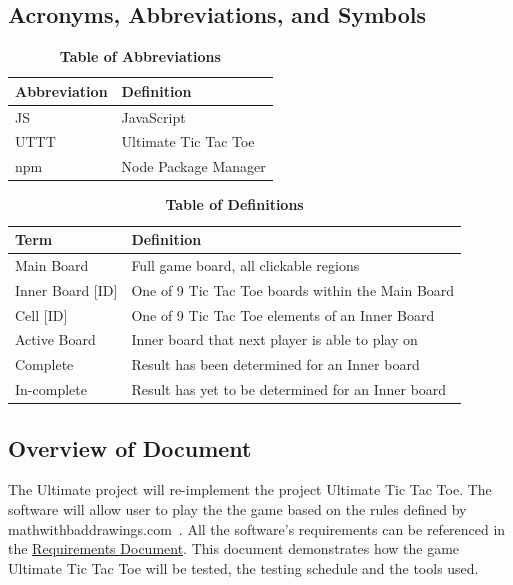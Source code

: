 \documentclass[12pt, titlepage]{article}
\begin{document}
\subsection{Acronyms, Abbreviations, and Symbols}
	
\begin{table}[hbp]
\caption{\textbf{Table of Abbreviations}} \label{Table}

\begin{tabularx}{\textwidth}{p{3cm}X}
\toprule
\textbf{Abbreviation} & \textbf{Definition} \\
\midrule
JS & JavaScript\\
UTTT & Ultimate Tic Tac Toe\\
npm & Node Package Manager\\
\bottomrule
\end{tabularx}

\end{table}

\begin{table}[!htbp]
\caption{\textbf{Table of Definitions}} \label{Table}

\begin{tabularx}{\textwidth}{p{3cm}X}
\toprule
\textbf{Term} & \textbf{Definition}\\
\midrule
Main Board & Full game board, all clickable regions \\
Inner Board [ID] & One of 9 Tic Tac Toe boards within the Main Board\\
Cell [ID] & One of 9 Tic Tac Toe elements of an Inner Board\\
Active Board & Inner board that next player is able to play on\\
Complete & Result has been determined for an Inner board \\
In-complete & Result has yet to be determined for an Inner board \\
\bottomrule
\end{tabularx}

\end{table}	

\subsection{Overview of Document}

The Ultimate  project will re-implement the project Ultimate Tic Tac Toe. The
software will allow user to play the the game based on the rules defined by
mathwithbaddrawings.com~\citep{Rules}. All the software's requirements can be
referenced in the \href{run:../SRS/SRS.pdf}{Requirements Document}. This document
demonstrates how the game Ultimate Tic Tac Toe will be tested, the testing
schedule and the tools used.
\end{document}
